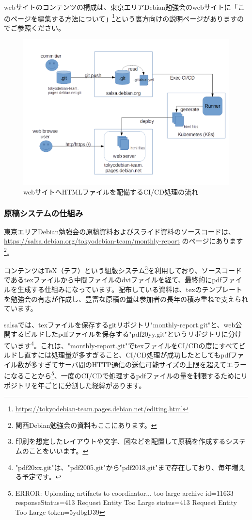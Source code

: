 \documentclass[mingoth,a4paper]{jsarticle}
\begin{document}
webサイトのコンテンツの構成は、東京エリアDebian勉強会のwebサイトに「このページを編集する方法について」\footnote{\url{https://tokyodebian-team.pages.debian.net/editing.html}}という裏方向けの説明ページがありますのでご参照ください。


\begin{figure}[H]
\begin{center}
  \includegraphics[width=12cm]{image201806/gitflow_web.png}
  \caption{webサイトへHTMLファイルを配備するCI/CD処理の流れ}
  \label{fig:deploy-html-CICD}
\end{center}
\end{figure}


\subsubsection{原稿システムの仕組み}

東京エリアDebian勉強会の原稿資料およびスライド資料のソースコードは、\url{https://salsa.debian.org/tokyodebian-team/monthly-report} のページにあります\footnote{関西Debian勉強会の資料もここにあります。}。


コンテンツはTeX（テフ）という組版システム\footnote{印刷を想定したレイアウトや文字、図などを配置して原稿を作成するシステムのことをいいます。}を利用しており、ソースコードであるtexファイルから中間ファイルのdviファイルを経て、最終的にpdfファイルを生成する仕組みになっています。配布している資料は、texのテンプレートを勉強会の有志が作成し、豊富な原稿の量は参加者の長年の積み重ねで支えられています。


salsaでは、texファイルを保存するgitリポジトリ"monthly-report.git"と、web公開するビルドしたpdfファイルを保存する"pdf20yy.git"というリポジトリに分けています\footnote{"pdf20xx.git"は、"pdf2005.git"から"pdf2018.git"まで存在しており、毎年増える予定です。}。これは、"monthly-report.git"でtexファイルをCI/CDの度にすべてビルドし直すには処理量が多すぎること、CI/CD処理が成功したとしてもpdfファイル数が多すぎてサーバ間のHTTP通信の送信可能サイズの上限を超えてエラーになることから\footnote{ERROR: Uploading artifacts to coordinator... too large archive id=11633 responseStatus=413 Request Entity Too Large status=413 Request Entity Too Large token=5ydbgD39}、一度のCI/CDで処理するpdfファイルの量を制限するためにリポジトリを年ごとに分割した経緯があります。
\end{document}
